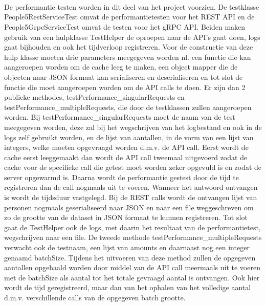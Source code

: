 
~\autocite{quarkusgRPCclient}\\
~\autocite{SmallRyeMutiny}\\
~\autocite{MultiSubscribing}\\

De performantie testen worden in dit deel van het project voorzien. De testklasse People5RestServiceTest omvat de performantietesten voor het REST API
en de People5GrpcServiceTest omvat de testen voor het gRPC API. Beiden maken gebruik van een hulpklasse TestHelper de oproepen naar de API's gaat doen,
logs gaat bijhouden en ook het tijdverloop registreren. Voor de constructie van deze hulp klasse moeten drie parameters meegegeven worden nl. een functie
die kan aangeroepen worden om de cache leeg te maken, een object mapper die de objecten naar JSON formaat kan serialiseren en deserialiseren en tot slot de
functie die moet aangeroepen worden om de API calls te doen. Er zijn dan 2 publieke methodes, testPerformance\_singularRequests en testPerformance\_multipleRequests,
die door de testklassen zullen aangeroepen worden. Bij testPerformance\_singularRequests moet de naam van de test meegegeven worden, deze zal bij het wegschrijven
van het logbestand en ook in de logs zelf gebruikt worden, en de lijst van aantallen, in de vorm van een lijst van integers, welke moeten opgevraagd worden
d.m.v. de API call. Eerst wordt de cache eerst leeggemaakt dan wordt de API call tweemaal uitgevoerd zodat de cache voor de specifieke call die getest moet worden
zeker opgevuld is en zodat de server opgewarmd is. Daarna wordt de performantie gestest door de tijd te registreren dan de call nogmaals uit te voeren.
Wanneer het antwoord ontvangen is wordt de tijdsduur vastgelegd. Bij de REST calls wordt de ontvangen lijst van personen nogmaals geserialiseerd naar JSON
en naar een file weggeschreven om zo de grootte van de dataset in JSON formaat te kunnen registreren.
Tot slot gaat de TestHelper ook de logs, met daarin het resultaat van de performantietest, wegschrijven naar een file.
De tweede methode testPerformance\_multipleRequests verwacht ook de testnaam, een lijst van amounts en daarnaast nog een integer genaamd batchSize.
Tijdens het uitvoeren van deze method zullen de opgegeven aantallen opgehaald worden door middel van de API call meermaals uit te voeren met de batchSize als aantal
tot het totale gevraagd aantal is ontvangen. Ook hier wordt de tijd geregistreerd, maar dan van het ophalen van het volledige aantal d.m.v.
verschillende calls van de opgegeven batch grootte.\\

